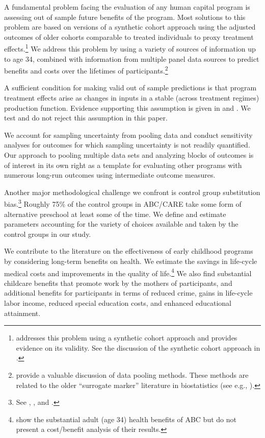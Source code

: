 A fundamental problem facing the evaluation of any human capital program is assessing out of sample future benefits of the program. Most solutions to this problem are based on versions of a synthetic cohort approach using the adjusted outcomes of older cohorts comparable to treated individuals to proxy treatment effects.\footnote{\cite{Mincer_1974_schooling} addresses this problem using a synthetic cohort approach and provides evidence on its validity. See the discussion of the synthetic cohort approach in \cite{Heckman_Lochner_ea_2006_HEE}.} We address this problem by using a variety of sources of information up to age 34, combined with information from multiple panel data sources to predict benefits and costs over the lifetimes of participants.\footnote{\citet{Ridder_Moffitt_2007_hbk_metricsdata} provide a valuable discussion of data pooling methods. These methods are related to the older ``surrogate marker'' literature in biostatistics (see e.g., \citealp{Prentice_1989_Surrogate_SiM}).}

A sufficient condition for making valid out of sample predictions is that program treatment effects arise as changes in inputs in a stable (across treatment regimes) production function. Evidence supporting this assumption is given in \citet{Heckman_Pinto_etal_2013_PerryFactor} and \cite{Attanasio-etal_2015_NBER_Estimating-Production}. We test and do not reject this assumption in this paper.

We account for sampling uncertainty from pooling data and conduct sensitivity analyses for outcomes for which sampling uncertainty is not readily quantified. Our approach to pooling multiple data sets and analyzing blocks of outcomes is of interest in its own right as a template for evaluating other programs with numerous long-run outcomes using intermediate outcome measures.

Another major methodological challenge we confront is control group substitution bias.\footnote{See \cite{Heckman_1992_randomization}, \cite{Heckman_Hohmann_etal_2000_QJE}, and \cite{Kline_Walters_2016_QJE}.} Roughly 75\% of the control groups in ABC/CARE take some form of alternative preschool at least some of the time. We define and estimate parameters accounting for the variety of choices available and taken by the control groups in our study.

We contribute to the literature on the effectiveness of early childhood programs by considering long-term benefits on health. We estimate the savings in life-cycle medical costs and improvements in the quality of life.\footnote{\cite{Campbell_Conti_etal_2014_EarlyChildhoodInvestments} show the substantial adult (age 34) health benefits of ABC but do not present a cost/benefit analysis of their results.} We also find substantial childcare benefits that promote work by the mothers of participants, and additional benefits for participants in terms of reduced crime, gains in life-cycle labor income, reduced special education costs, and enhanced educational attainment.

